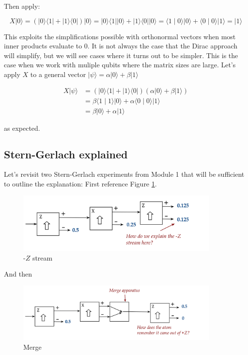 \documentclass[main.tex]{subfiles}
\begin{document}
    Then apply:
    
    $$
    X|0\rangle=(|0\rangle\langle 1|+| 1\rangle\langle 0|)|0\rangle=|0\rangle\langle 1|| 0\rangle+|1\rangle\langle 0|| 0\rangle=\langle 1 \mid 0\rangle|0\rangle+\langle 0 \mid 0\rangle|1\rangle=|1\rangle
    $$
    
    This exploits the simplifications possible with orthonormal vectors when most inner products evaluate to $0 .$ It is not always the case that the Dirac approach will simplify, but we will see cases where it turns out to be simpler. This is the case when we work with muliple qubits where the matrix sizes are large. Let's apply $X$ to a general vector $|\psi\rangle=\alpha|0\rangle+\beta|1\rangle$
    
    $$
    \begin{aligned}
    X|\psi\rangle &=(|0\rangle\langle 1|+| 1\rangle\langle 0|)(\alpha|0\rangle+\beta|1\rangle) \\
    &=\beta\langle 1 \mid 1\rangle|0\rangle+\alpha\langle 0 \mid 0\rangle|1\rangle \\
    &=\beta|0\rangle+\alpha|1\rangle
    \end{aligned}
    $$
    
    as expected. 
    
\subsection{Stern-Gerlach explained}
    
    Let's revisit two Stern-Gerlach experiments from Module 1 that will be sufficient to outline the explanation: First reference Figure \ref{fig:50sg3}.
    
    \begin{figure}
        \centering
        \includegraphics[width=4in]{notes/figs/n05/50sg3.png}
        \caption{-$Z$ stream}
        \label{fig:50sg3}
    \end{figure} 
    
    And then
    
    \begin{figure}
        \centering
        \includegraphics[width=4in]{notes/figs/n05/51sg4.png}
        \caption{Merge}
        \label{fig:51sg4}
    \end{figure}
    
\end{document}
